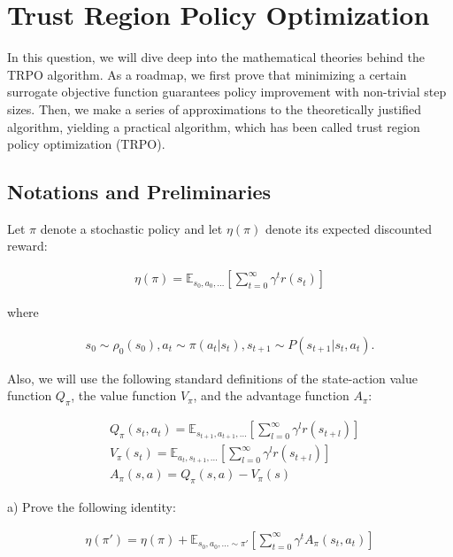 \section{Trust Region Policy Optimization}

In this question, we will dive deep into the mathematical theories behind the TRPO algorithm. As a roadmap, we first prove that minimizing a certain surrogate objective function guarantees policy improvement with non-trivial step sizes. Then, we make a series of approximations to the theoretically justified algorithm, yielding a practical algorithm, which has been called trust region policy optimization (TRPO). 

\subsection{Notations and Preliminaries}

Let $\pi$ denote a stochastic policy and let $\eta(\pi)$ denote its expected discounted reward:

\begin{align*}
    \eta(\pi) = \mathbb{E}_{s_0, a_0, \ldots} [\sum_{t = 0}^{\infty} \gamma^t r(s_t)]
\end{align*}

where

\begin{align*}
    s_0 \sim \rho_0(s_0), a_t \sim \pi(a_t | s_t), s_{t + 1} \sim P(s_{t + 1} | s_t, a_t).
\end{align*}

Also, we will use the following standard definitions of the state-action value function $Q_\pi$, the value function $V_\pi$, and the advantage function $A_\pi$:

\begin{align*}
    &Q_\pi(s_t, a_t) = \mathbb{E}_{s_{t+1}, a_{t+1}, \ldots} [\sum_{l = 0}^{\infty} \gamma^l r(s_{t + l})] \\
    &V_\pi(s_t) = \mathbb{E}_{a_t, s_{t+1}, \ldots} [\sum_{l = 0}^{\infty} \gamma^l r(s_{t + l})] \\
    &A_\pi(s, a) = Q_\pi(s, a) - V_\pi(s)
\end{align*}


a) Prove the following identity:

\begin{align}\label{eq_3}
    \eta(\pi')=\eta(\pi)+\mathbb{E}_{s_{0}, a_{0}, \ldots \sim \pi'} [\sum_{t = 0}^{\infty} \gamma^t A_\pi(s_t, a_t)]
\end{align}

